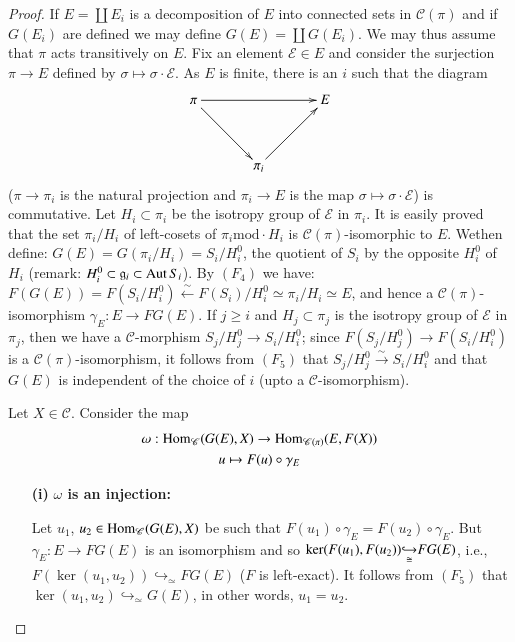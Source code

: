 \begin{proof}
If $E=\coprod E_{i}$ is a decomposition of $E$ into connected sets in
$\mathscr{C}(\pi)$ and if $G(E_{i})$ are defined we may define
$G(E)=\coprod G(E_{i})$. We may thus assume that $\pi$ acts
transitively on $E$. Fix an element $\mathscr{E}\in E$ and consider
the surjection $\pi\to E$ defined by $\sigma\mapsto
\sigma\cdot\mathscr{E}$. As $E$ is finite, there is an $i$ such that
the diagram
\[
\xymatrix@=1.2cm{
\pi \ar[rr]\ar[dr] && E\\
& \pi_{i} \ar[ur]
}
\]
($\pi\to \pi_{i}$ is the natural projection and $\pi_{i}\to E$ is the
map $\sigma\mapsto \sigma\cdot \mathscr{E}$) is commutative. Let
$H_{i}\subset \pi_{i}$ be the isotropy group of $\mathscr{E}$ in
$\pi_{i}$. It is easily proved that the set $\pi_{i}/H_{i}$ of
left-cosets of $\pi_{i}\text{mod}\cdot H_{i}$ is
$\mathscr{C}(\pi)$-isomorphic to $E$. We\pageoriginale then define:
$G(E)=G(\pi_{i}/H_{i})=S_{i}/H^{0}_{i}$, the quotient of $S_{i}$ by
the opposite $H^{0}_{i}$ of $H_{i}$ (remark: $H^{0}_{i}\subset
\mathfrak{g}_{i}\subset \operatorname{Aut} S_{i}$). By $(F_{4})$ we have:
$F(G(E))=F(S_{i}/H^{0}_{i})\xleftarrow{\sim}F(S_{i})/H^{0}_{i}\simeq
\pi_{i}/H_{i}\simeq E$, and hence a $\mathscr{C}(\pi)$-isomorphism
$\gamma_{E}:E\to FG(E)$. If $j\geq i$ and $H_{j}\subset \pi_{j}$ is
the isotropy group of $\mathscr{E}$ in $\pi_{j}$, then we have a
$\mathscr{C}$-morphism $S_{j}/H^{0}_{j}\to S_{i}/H^{0}_{i}$; since
$F(S_{j}/H^{0}_{j})\to F(S_{i}/H^{0}_{i})$ is a
$\mathscr{C}(\pi)$-isomorphism, it follows from $(F_{5})$ that
$S_{j}/H^{0}_{j}\xrightarrow{\sim}S_{i}/H^{0}_{i}$ and that $G(E)$ is
independent of the choice of $i$ (upto a $\mathscr{C}$-isomorphism).

Let $X\in\mathscr{C}$. Consider the map
\begin{gather*}
\omega:\operatorname{Hom}_{\mathscr{C}}(G(E),X)\to \operatorname{Hom}_{\mathscr{C(\pi)}}(E,F(X))\\
u\mapsto F(u)\circ \gamma_{E}
\end{gather*}
\begin{itemize}
\item[{\bf(i)}] {\bf {\boldmath$\omega$} is an injection:}

Let $u_{1}$, $u_{2}\in \operatorname{Hom}_{\mathscr{C}}(G(E),X)$ be such that
$F(u_{1})\circ \gamma_{E}=F(u_{2})\circ \gamma_{E}$. But
$\gamma_{E}:E\to FG(E)$ is an isomorphism and so
$\ker(F(u_{1}),F(u_{2}))\break {\displaystyle{\mathop{\hookrightarrow}_{\cong}}}FG(E)$, 
i.e.,
$F(\ker(u_{1},u_{2})){\displaystyle{\mathop{\hookrightarrow}_{\simeq}}}FG(E)$ 
($F$ is left-exact). It follows from $(F_{5})$ that
$\ker(u_{1},u_{2}){\displaystyle{\mathop{\hookrightarrow}_{\simeq}}}G(E)$,
in other words, $u_{1}=u_{2}$.   


\end{itemize}
\end{proof}
